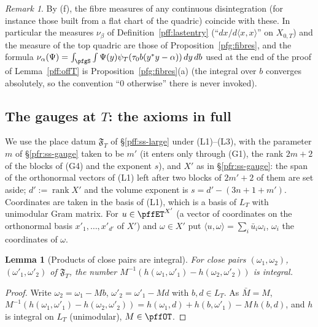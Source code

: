 \documentclass[10pt]{amsart}
\newtheorem{lemma}[theorem]{Lemma}
\theoremstyle{definition}
\theoremstyle{remark}
\newtheorem{remark}[theorem]{Remark}
\begin{document}
\begin{remark}\label{pfg:rem-fibres}
By (f), the fibre measures of any continuous disintegration (for instance those built from a flat chart of the quadric) coincide with these. In particular the measures $\nu_\beta$ of Definition~\ref{pff:lastentry}
(``$dx/d\langle x,x\rangle$'' on $X_{0,T}$) and the measure of the top quadric are those of
Proposition~\ref{pfg:fibres}, and the formula $\nu_\alpha(\Psi)=\int_{\pfgS}\int\Psi(y)\psi_T(\tau_0b(y^*y-\alpha))\,dy\,db$
used at the end of the proof of Lemma~\ref{pff:offT} is Proposition~\ref{pfg:fibres}(a) (the integral over $b$
converges absolutely, so the convention ``$0$ otherwise'' there is never invoked).
\end{remark}

\subsection{The gauges at $T$: the axioms in full}\label{pfg:ss-gauge}

We use the place datum $\mathfrak F_T$ of \S\ref{pff:ss-large} under (L1)--(L3), with the parameter $m$ of
\S\ref{pfr:ss-gauge} taken to be $m'$ (it enters only through (G1), the rank $2m+2$ of the blocks of (G4) and the
exponent $s$), and $X'$ as in
\S\ref{pfr:ss-gauge}: the span of the orthonormal vectors of (L1) left after two blocks of $2m'+2$ of them are set
aside; $d':=\operatorname{rank}X'$ and the volume exponent is $s=d'-(3n+1+m')$. Coordinates are taken in the basis of
(L1), which is a basis of $L_T$ with unimodular Gram matrix. For $u\in\pffET^{X'}$ (a vector of coordinates on the
orthonormal basis $x'_1,\dots,x'_{d'}$ of $X'$) and $\omega\in X'$ put $\langle u,\omega\rangle=\sum_i\bar u_i\omega_i$,
$\omega_i$ the coordinates of $\omega$.

\begin{lemma}[Products of close pairs are integral]\label{pfg:Dint}
For close pairs $(\omega_1,\omega_2)$, $(\omega'_1,\omega'_2)$ of $\mathfrak F_T$, the number
$M^{-1}(h(\omega_1,\omega'_1)-h(\omega_2,\omega'_2))$ is integral.
\end{lemma}
\begin{proof}
Write $\omega_2=\omega_1-Mb$, $\omega'_2=\omega'_1-Md$ with $b,d\in L_T$. As $\bar M=M$,
$M^{-1}(h(\omega_1,\omega'_1)-h(\omega_2,\omega'_2))=h(\omega_1,d)+h(b,\omega'_1)-M\,h(b,d)$, and $h$ is integral on
$L_T$ (unimodular), $M\in\pffOT$.
\end{proof}
\end{document}
